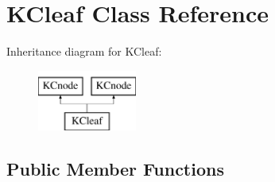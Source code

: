 \hypertarget{class_k_cleaf}{
\section{KCleaf Class Reference}
\label{class_k_cleaf}
}
Inheritance diagram for KCleaf:\begin{figure}[H]
\begin{center}
\leavevmode
\includegraphics[height=2cm]{class_k_cleaf}
\end{center}
\end{figure}
\subsection*{Public Member Functions}
